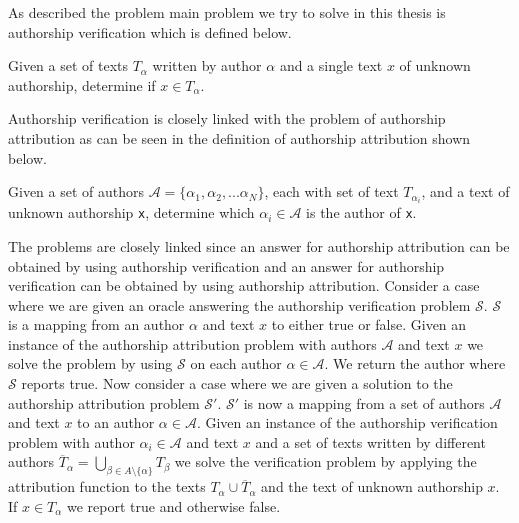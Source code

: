 
As described the problem main problem we try to solve in this thesis is
authorship verification which is defined below.

\begin{definition}
    \label{def:authorship_verification}

    Given a set of texts $T_\alpha$ written by author $\alpha$ and a single
    text $x$ of unknown authorship, determine if $x \in T_\alpha$.

\end{definition}

Authorship verification is closely linked with the problem of authorship
attribution as can be seen in the definition of authorship attribution shown
below.

\begin{definition}

    Given a set of authors $\mathcal{A} = \{ \alpha_1, \alpha_2,...\alpha_N\}$,
    each with set of text $T_{\alpha_i}$, and a text of unknown authorship
    \texttt{x}, determine which $\alpha_i \in \mathcal{A}$ is the author of
    \texttt{x}.

\end{definition}

The problems are closely linked since an answer for authorship attribution
can be obtained by using authorship verification and an answer for authorship
verification can be obtained by using authorship attribution. Consider a case
where we are given an oracle answering the authorship verification problem
$\mathcal{S}$. $\mathcal{S}$ is a mapping from an author $\alpha$ and text
$x$ to either true or false. Given an instance of the authorship attribution
problem with authors $\mathcal{A}$ and text $x$ we solve the problem by using
$\mathcal{S}$ on each author $\alpha \in \mathcal{A}$. We return the author
where $\mathcal{S}$ reports true. Now consider a case where we are given a
solution to the authorship attribution problem $\mathcal{S}'$. $\mathcal{S}'$
is now a mapping from a set of authors $\mathcal{A}$ and text $x$ to an author
$\alpha \in \mathcal{A}$. Given an instance of the authorship verification
problem with author $\alpha_i \in \mathcal{A}$ and text $x$ and a set of texts
written by different authors $\overline{T}_{\alpha} = \bigcup_{\beta \in A
\setminus \{\alpha\}} T_\beta$ we solve the verification problem by applying the
attribution function to the texts $T_{\alpha} \cup \overline{T}_{\alpha}$ and
the text of unknown authorship $x$. If $x \in T_{\alpha}$ we report true and
otherwise false.
